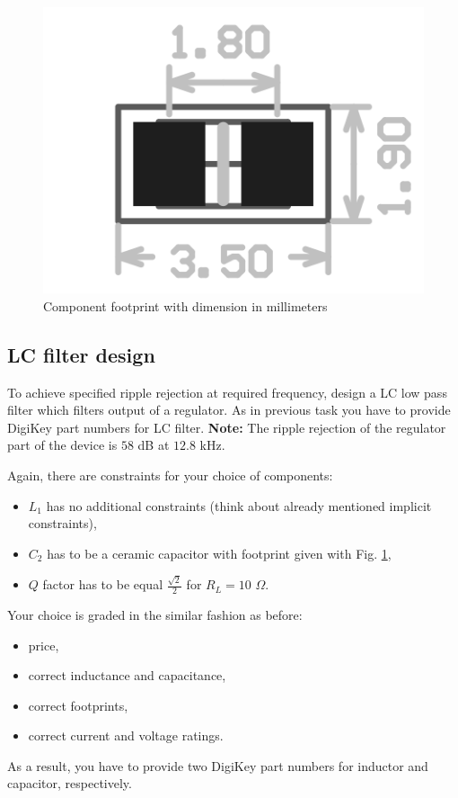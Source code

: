 \documentclass[a4paper]{article}
\begin{document}
\begin{figure}[h!]
\centering
\includegraphics[width=\linewidth]{images/footprint.png}
\caption{Component footprint with dimension in millimeters}
\label{fig:footprint}
\end{figure}

\newpage

\subsection{LC filter design}
\label{ele:task:2}
To achieve specified ripple rejection at required frequency, design a LC low 
pass filter which filters output of a regulator. As in previous task you have 
to provide DigiKey part numbers for LC filter. \textbf{Note:} The ripple 
rejection of the regulator part of the device is $58$ dB at $12.8$ kHz.

Again, there are constraints for your choice of components:
\begin{itemize}
\item $L_1$ has no additional constraints 
(think about already mentioned implicit constraints),
\item $C_2$ has to be a ceramic capacitor with footprint given with 
Fig. \ref{fig:footprint},
\item $Q$ factor has to be equal $\frac{\sqrt{2}}{2}$ for $R_L = 10$ $\Omega$.  
\end{itemize}

Your choice is graded in the similar fashion as before:
\begin{itemize}
\item price,
\item correct inductance and capacitance,
\item correct footprints, 
\item correct current and voltage ratings.
\end{itemize}
As a result, you have to provide two DigiKey part numbers for inductor and 
capacitor, respectively. 
\newpage
\end{document}
